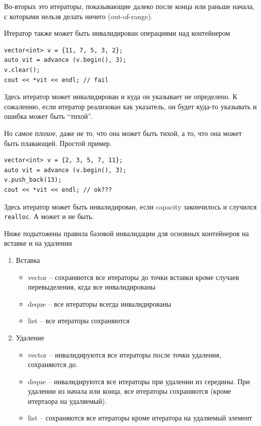 \documentclass[a4paper,12pt,oneside]{article}
\begin{document}
Во-вторых это итераторы, показывающие далеко после конца или раньше начала, с которыми нельзя делать ничего (out-of-range).

Итератор также может быть инвалидирован операциями над контейнером

\begin{lstlisting}
vector<int> v = {11, 7, 5, 3, 2};
auto vit = advance (v.begin(), 3);
v.clear();
cout << *vit << endl; // fail
\end{lstlisting}

Здесь итератор может инвалидирован и куда он указывает не определено. К сожалению, если итератор реализован как указатель, он будет куда-то указывать и ошибка может быть ``тихой''.

Но самое плохое, даже не то, что она может быть тихой, а то, что она может быть плавающей. Простой пример.

\begin{lstlisting}
vector<int> v = {2, 3, 5, 7, 11};
auto vit = advance (v.begin(), 3);
v.push_back(13);
cout << *vit << endl; // ok???
\end{lstlisting}

Здесь итератор может быть инвалидирован, если capacity закончилось и случился \lstinline!realloc!. А может и не быть.

Ниже подытожены правила базовой инвалидации для основных контейнеров на вставке и на удалении

\begin{enumerate}
\item Вставка
\begin{itemize}
\item vector -- сохраняются все итераторы до точки вставки кроме случаев перевыделения, кгда все инвалидированы
\item deque -- все итераторы всегда инвалидированы
\item list -- все итераторы сохраняются
\end{itemize}
\item Удаление
\begin{itemize}
\item vector – инвалидируются все итераторы после точки удаления, сохраняются до.
\item deque – инвалидируются все итераторы при удалении из середины. При удалении из начала или конца, все итераторы сохраняются (кроме итертаора на удаляемый).
\item list – сохраняются все итераторы кроме итератора на удаляемый элемент
\end{itemize}
\end{enumerate}
\end{document}
